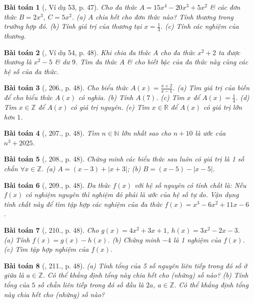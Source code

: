 \documentclass{article}
\newtheorem{baitoan}{Bài toán}
\begin{document}
\begin{baitoan}[\cite{Tuyen_Toan_7}, Ví dụ 53, p. 47]
	Cho đa thức $A = 15x^4 - 20x^3 + 5x^2$ \& các đơn thức $B = 2x^3$, $C = 5x^2$. (a) $A$ chia hết cho đơn thức nào? Tính thương trong trường hợp đó. (b) Tính giá trị của thương tại $x = \frac{1}{3}$. (c) Tính các nghiệm của thương.
\end{baitoan}

\begin{baitoan}[\cite{Tuyen_Toan_7}, Ví dụ 54, p. 48]
	Khi chia đa thức $A$ cho đa thức $x^2 + 2$ ta được thương là $x^2 - 5$ \& dư $9$. Tìm đa thức $A$ \& cho biết bậc của đa thức này cùng các hệ số của đa thức.
\end{baitoan}

\begin{baitoan}[\cite{Tuyen_Toan_7}, 206., p. 48]
	Cho biểu thức $A(x) = \frac{x + 2}{x - 1}$. (a) Tìm giá trị của biến để cho biểu thức $A(x)$ có nghĩa. (b) Tính $A(7)$. (c) Tìm $x$ để $A(x) = \frac{1}{4}$. (d) Tìm $x\in\mathbb{Z}$ để $A(x)$ có giá trị nguyên. (e) Tìm $x\in\mathbb{R}$ để $A(x)$ có giá trị lớn hơn $1$.
\end{baitoan}

\begin{baitoan}[\cite{Tuyen_Toan_7}, 207., p. 48]
	Tìm $n\in\mathbb{N}$ lớn nhất sao cho $n + 10$ là ước của $n^3 + 2025$.
\end{baitoan}

\begin{baitoan}[\cite{Tuyen_Toan_7}, 208., p. 48]
	Chứng minh các biểu thức sau luôn có giá trị là 1 số chẵn $\forall x\in\mathbb{Z}$. (a) $A = (x - 3) + |x + 3|$; (b) $B = (x - 5) - |x - 5|$.
\end{baitoan}

\begin{baitoan}[\cite{Tuyen_Toan_7}, 209., p. 48]
	Đa thức $f(x)$ với hệ số nguyên có tính chất là: Nếu $f(x)$ có nghiệm nguyên thì nghiệm đó phải là ước của hệ số tự do. Vận dụng tính chất này để tìm tập hợp các nghiệm của đa thức $f(x) = x^3 - 6x^2 + 11x - 6$.
\end{baitoan}

\begin{baitoan}[\cite{Tuyen_Toan_7}, 210., p. 48]
	Cho $g(x) = 4x^2 + 3x + 1$, $h(x) = 3x^2 - 2x - 3$. (a) Tính $f(x) = g(x) - h(x)$. (b) Chứng minh $-4$ là 1 nghiệm của $f(x)$. (c) Tìm tập hợp nghiệm của $f(x)$.
\end{baitoan}

\begin{baitoan}[\cite{Tuyen_Toan_7}, 211., p. 48]
	(a) Tính tổng của 5 số nguyên liên tiếp trong đó số ở giữa là $a\in\mathbb{Z}$. Có thể khẳng định tổng này chia hết cho (những) số nào? (b) Tính tổng của $5$ số chẵn liên tiếp trong đó số đầu là $2a$, $a\in\mathbb{Z}$. Có thể khẳng định tổng này chia hết cho (những) số nào?
\end{baitoan}
\end{document}
